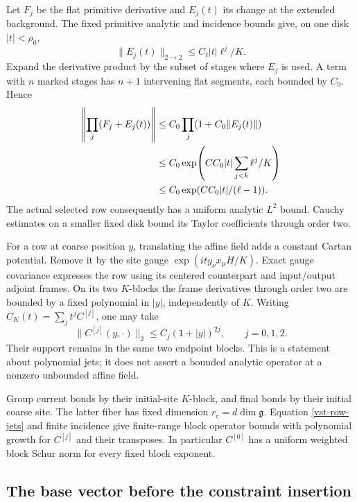 \documentclass[11pt]{article}
\theoremstyle{remark}
\begin{document}
Let \(F_j\) be the flat primitive derivative and
\(E_j(t)\) its change at the extended background.
The fixed primitive analytic and incidence bounds
give, on one disk \(|t|<\rho_0\),
\begin{equation}
                  \|E_j(t)\|_{2\to2}
                          \le C_\ell |t|\ell^j/K.
 \label{vst-stage-error}
\end{equation}
Expand the derivative product by the subset of stages
where \(E_j\) is used. A term with \(n\) marked stages
has \(n+1\) intervening flat segments, each bounded by
\(C_0\). Hence
\begin{align}
 \left\|\prod_j(F_j+E_j(t))\right\|
 &\le C_0\prod_j(1+C_0\|E_j(t)\|)\notag\\
 &\le C_0\exp\!\left(C C_0|t|
                         \sum_{j<k}\ell^j/K\right)\notag\\
 &\le C_0\exp(C C_0|t|/(\ell-1)).
 \label{vst-product-bound}
\end{align}
The actual selected row consequently has a uniform
analytic \(L^2\) bound. Cauchy estimates on a smaller
fixed disk bound its Taylor coefficients through order two.

For a row at coarse position \(y\), translating the
affine field adds a constant Cartan potential. Remove
it by the site gauge \(\exp(i t y_\nu x_\mu H/K)\).
Exact gauge covariance expresses the row using its
centered counterpart and input/output adjoint frames.
On its two \(K\)-blocks the frame derivatives through
order two are bounded by a fixed polynomial in \(|y|\),
independently of \(K\). Writing
\(C_K(t)=\sum_j t^j C^{[j]}\), one may take
\begin{equation}
        \|C^{[j]}(y,\cdot)\|_2
                  \le C_j(1+|y|)^{2j},
                  \qquad j=0,1,2.
 \label{vst-row-jets}
\end{equation}
Their support remains in the same two endpoint blocks.
This is a statement about polynomial jets; it does not
assert a bounded analytic operator at a nonzero unbounded
affine field.

Group current bonds by their initial-site \(K\)-block,
and final bonds by their initial coarse site. The latter
fiber has fixed dimension \(r_c=d\dim\mathfrak g\).
Equation \eqref{vst-row-jets} and finite incidence give
finite-range block operator bounds with polynomial
growth for \(C^{[j]}\) and their transposes.
In particular \(C^{[0]}\) has a uniform weighted block
Schur norm for every fixed block exponent.

\subsection{The base vector before the constraint insertion}
\label{vst-base-section}
\end{document}

